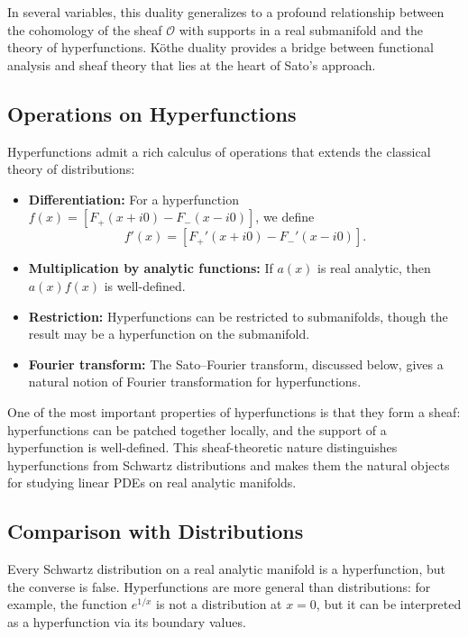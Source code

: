 In several variables, this duality generalizes to a profound relationship between the cohomology of the sheaf \(\mathcal{O}\) with supports in a real submanifold and the theory of hyperfunctions. K\"othe duality provides a bridge between functional analysis and sheaf theory that lies at the heart of Sato's approach.

\subsection{Operations on Hyperfunctions}

Hyperfunctions admit a rich calculus of operations that extends the classical theory of distributions:

\begin{itemize}
    \item \textbf{Differentiation:} For a hyperfunction \(f(x) = [F_+(x+i0) - F_-(x-i0)]\), we define
    \[
    f'(x) = [F_+'(x+i0) - F_-'(x-i0)].
    \]
    
    \item \textbf{Multiplication by analytic functions:} If \(a(x)\) is real analytic, then \(a(x)f(x)\) is well-defined.
    
    \item \textbf{Restriction:} Hyperfunctions can be restricted to submanifolds, though the result may be a hyperfunction on the submanifold.
    
    \item \textbf{Fourier transform:} The Sato--Fourier transform, discussed below, gives a natural notion of Fourier transformation for hyperfunctions.
\end{itemize}

One of the most important properties of hyperfunctions is that they form a sheaf: hyperfunctions can be patched together locally, and the support of a hyperfunction is well-defined. This sheaf-theoretic nature distinguishes hyperfunctions from Schwartz distributions and makes them the natural objects for studying linear PDEs on real analytic manifolds.

\subsection{Comparison with Distributions}

Every Schwartz distribution on a real analytic manifold is a hyperfunction, but the converse is false. Hyperfunctions are more general than distributions: for example, the function \(e^{1/x}\) is not a distribution at \(x = 0\), but it can be interpreted as a hyperfunction via its boundary values.

